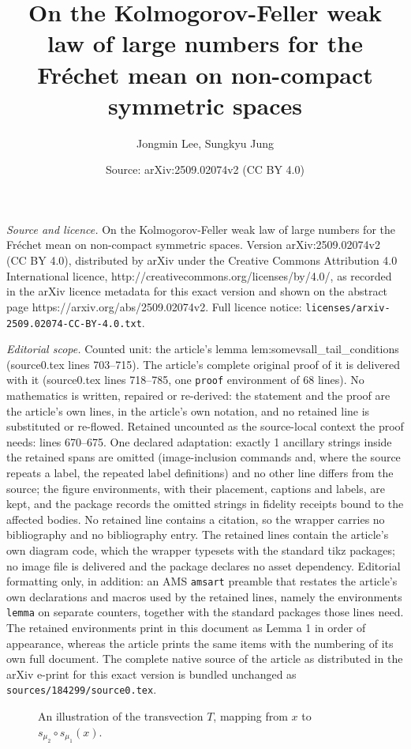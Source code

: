 \documentclass[10pt,a4paper]{amsart}
\title{On the Kolmogorov-Feller weak law of large numbers for the Fr\'{e}chet mean on non-compact symmetric spaces}
\author{Jongmin Lee, Sungkyu Jung}
\date{Source: arXiv:2509.02074v2 (CC BY 4.0)}
\begin{document}
\maketitle

\noindent\emph{Source and licence.} On the Kolmogorov-Feller weak law of large numbers for the Fr\'{e}chet mean on non-compact symmetric spaces. Version arXiv:2509.02074v2 (CC BY 4.0), distributed by arXiv under the Creative Commons Attribution 4.0 International licence, http://creativecommons.org/licenses/by/4.0/, as recorded in the arXiv licence metadata for this exact version and shown on the abstract page https://arxiv.org/abs/2509.02074v2. Full licence notice: \texttt{licenses/arxiv-2509.02074-CC-BY-4.0.txt}.\par\smallskip

\noindent\textit{Editorial scope.} Counted unit: the article's lemma lem:somevsall\_tail\_conditions (source0.tex lines 703--715). The article's complete original proof of it is delivered with it (source0.tex lines 718--785, one \texttt{proof} environment of 68 lines). No mathematics is written, repaired or re-derived: the statement and the proof are the article's own lines, in the article's own notation, and no retained line is substituted or re-flowed.  Retained uncounted as the source-local context the proof needs: lines 670--675.  One declared adaptation: exactly 1 ancillary strings inside the retained spans are omitted (image-inclusion commands and, where the source repeats a label, the repeated label definitions) and no other line differs from the source; the figure environments, with their placement, captions and labels, are kept, and the package records the omitted strings in fidelity receipts bound to the affected bodies.  No retained line contains a citation, so the wrapper carries no bibliography and no bibliography entry.  The retained lines contain the article's own diagram code, which the wrapper typesets with the standard tikz packages; no image file is delivered and the package declares no asset dependency.  Editorial formatting only, in addition: an AMS \texttt{amsart} preamble that restates the article's own declarations and macros used by the retained lines, namely the environments \texttt{lemma} on separate counters, together with the standard packages those lines need.  The retained environments print in this document as Lemma 1 in order of appearance, whereas the article prints the same items with the numbering of its own full document.  The complete native source of the article as distributed in the arXiv e-print for this exact version is bundled unchanged as \texttt{sources/184299/source0.tex}.
\begin{figure}[htbp!]
\centering

\caption{An illustration of the transvection $T$, mapping from $x$ to $s_{\mu_2}\circ s_{\mu_1}(x)$.}
\label{fig:transvection}
\end{figure}
\end{document}
